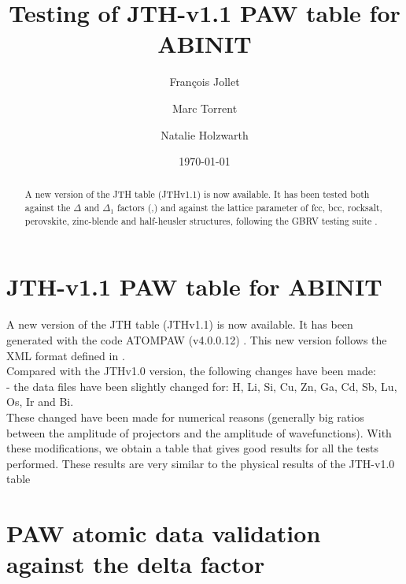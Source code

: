 \documentclass[10pt]{revtex4}
\begin{document}
\title{Testing of JTH-v1.1 PAW table for ABINIT}


\author{Fran\c{c}ois Jollet}
\author{Marc Torrent }
\author{ Natalie Holzwarth}
\address{Department of Physics, Wake Forest University, Winston-Salem, NC 27109 USA}

\date{\today}


\begin{abstract}
A new version of the JTH table (JTHv1.1) is now available. It has been tested both against the $\Delta$ and $\Delta_1$ factors (\cite{Lejaeghere},\cite{Jollet}) and against the lattice parameter of fcc, bcc, rocksalt, perovskite, zinc-blende and half-heusler structures, following the GBRV testing suite \cite{Garrity}.
\end{abstract}

\maketitle


\section{JTH-v1.1 PAW table for ABINIT}

A new version of the JTH table (JTHv1.1) is now available. It has been generated with the code ATOMPAW (v4.0.0.12) \cite{web4}. This new version follows the XML format defined in \cite{web2}.\\
Compared with the JTHv1.0 version, the following changes have been made:\\
- the data files have been slightly changed for: H, Li, Si, Cu, Zn, Ga, Cd, Sb, Lu, Os, Ir and Bi.\\
These changed have been made for numerical reasons (generally big ratios between the amplitude of projectors and the amplitude of wavefunctions).
With these modifications, we obtain a table that gives good results for all the tests performed. These results are very similar to the physical results of the JTH-v1.0 table

\section{PAW atomic data validation against the delta factor}
\end{document}
